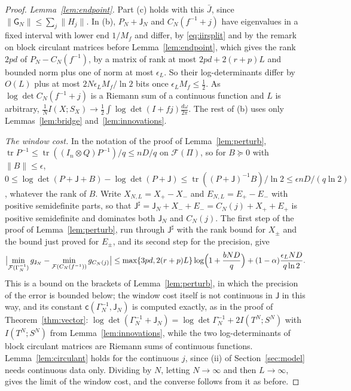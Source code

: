 \documentclass[11pt,onecolumn]{IEEEtran}
\newcommand{\tr}{\operatorname{tr}}
\newcommand{\dw}{\tfrac{d\omega}{2\pi}}
\begin{document}
\begin{proof}
\emph{Lemma~\ref{lem:endpoint}.} Part (c) holds with this $\bar J$,
since $\|\mathsf G_N\|\le\sum_j\|H_j\|$. In (b), $P_N+\mathsf J_N$ and
$C_N(f^{-1}+j)$ have eigenvalues in a fixed interval with lower end
$1/M_f$ and differ, by \eqref{eq:iirsplit} and by the remark on block
circulant matrices before Lemma~\ref{lem:endpoint}, which gives the rank
$2pd$ of $P_N-C_N(f^{-1})$, by a matrix of rank at most $2pd+2(r+p)L$ and
bounded norm plus one of norm
at most $\epsilon_L$. So their log-determinants differ by $O(L)$ plus at
most $2N\epsilon_LM_f/\ln2$ bits once $\epsilon_LM_f\le\tfrac12$. As
$\log\det C_N(f^{-1}+j)$ is a Riemann sum of a continuous function and
$L$ is arbitrary, $\tfrac1NI(X;S_X)\to\tfrac12\int\log\det(I+fj)\dw$. The
rest of (b) uses only Lemmas~\ref{lem:bridge} and~\ref{lem:innovations}.

\emph{The window cost.} In the notation of the proof of
Lemma~\ref{lem:perturb}, $\tr P^{-1}\le\tr((I_n\otimes Q)P^{-1})/q\le nD/q$ on
$\mathcal F(\Pi)$, so for $B\succeq0$ with $\|B\|\le\epsilon$,
$0\le\log\det(P+\mathsf J+B)-\log\det(P+\mathsf J)\le\tr((P+\mathsf J)^{-1}B)/\ln2\le\epsilon nD/(q\ln2)$,
whatever the rank of $B$. Write $X_{N,L}=X_+-X_-$ and $E_{N,L}=E_+-E_-$
with positive semidefinite parts, so that
$\mathsf J^\sharp=\mathsf J_N+X_-+E_-=C_N(j)+X_++E_+$ is positive
semidefinite and dominates both $\mathsf J_N$ and $C_N(j)$. The first step
of the proof of Lemma~\ref{lem:perturb}, run through $\mathsf J^\sharp$ with
the rank bound for $X_\pm$ and the bound just proved for $E_\pm$, and its
second step for the precision, give
\[
\bigl|\min_{\mathcal F(\Gamma_N^{-1})}g_{\mathsf J_N}-\min_{\mathcal F(C_N(f^{-1}))}g_{C_N(j)}\bigr|
\le\max\{3pd,2(r+p)L\}\log\Bigl(1+\frac{bND}q\Bigr)+(1-\alpha)\frac{\epsilon_LND}{q\ln2}.
\]
This is a bound on the brackets of Lemma~\ref{lem:perturb}, in which the
precision of the error is bounded below; the window cost itself is not
continuous in $\mathsf J$ in this way, and its constant
$\mathsf c(\Gamma_N^{-1},\mathsf J_N)$ is computed exactly, as in the proof of
Theorem~\ref{thm:vector}:
$\log\det(\Gamma_N^{-1}+\mathsf J_N)=\log\det\Gamma_N^{-1}+2I(T^N;S^N)$ with
$I(T^N;S^N)$ from Lemma~\ref{lem:innovations}, while the two
log-determinants of block circulant matrices are Riemann sums of
continuous functions. Lemma~\ref{lem:circulant} holds for the continuous
$j$, since (ii) of Section~\ref{sec:model} needs continuous data only.
Dividing by $N$, letting $N\to\infty$ and then $L\to\infty$, gives the
limit of the window cost, and the converse follows from it as before.


\end{proof}
\end{document}
